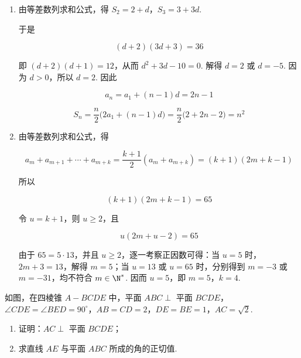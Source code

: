 \begin{solution}
\begin{enumerate}
\item 由等差数列求和公式，得 \(S_2=2+d\)，\(S_3=3+3d\).

于是

\[
(d+2)(3d+3)=36
\]

即 \((d+2)(d+1)=12\)，从而 \(d^2+3d-10=0\). 解得 \(d=2\) 或 \(d=-5\). 因为 \(d>0\)，所以 \(d=2\). 因此

\[
a_n=a_1+(n-1)d=2n-1
\]

\[
S_n=\frac{n}{2}\bigl(2a_1+(n-1)d\bigr)=\frac{n}{2}\bigl(2+2n-2\bigr)=n^2
\]

\item 由等差数列求和公式，得

\[
a_m+a_{m+1}+\cdots+a_{m+k}=\frac{k+1}{2}(a_m+a_{m+k})=(k+1)(2m+k-1)
\]

所以

\[
(k+1)(2m+k-1)=65
\]

令 \(u=k+1\)，则 \(u\geqslant2\)，且

\[
u(2m+u-2)=65
\]

由于 \(65=5\cdot13\)，并且 \(u\geqslant2\)，逐一考察正因数可得：当 \(u=5\) 时，\(2m+3=13\)，解得 \(m=5\)；当 \(u=13\) 或 \(u=65\) 时，分别得到 \(m=-3\) 或 \(m=-31\)，均不符合 \(m\in\N^*\). 因而 \(u=5\)，即 \(m=5\)，\(k=4\).
\end{enumerate}
\end{solution}

\begin{problem}
如图，在四棱锥 \(A - BCDE\) 中，平面 \(ABC \perp\) 平面 \(BCDE\)，\(\angle CDE = \angle BED = 90^\circ\)，\(AB = CD = 2\)，\(DE = BE = 1\)，\(AC = \sqrt{2}\).

\begin{enumerate}
\item 证明：\(AC \perp\) 平面 \(BCDE\)；
\item 求直线 \(AE\) 与平面 \(ABC\) 所成的角的正切值.
\end{enumerate}
\end{problem}

